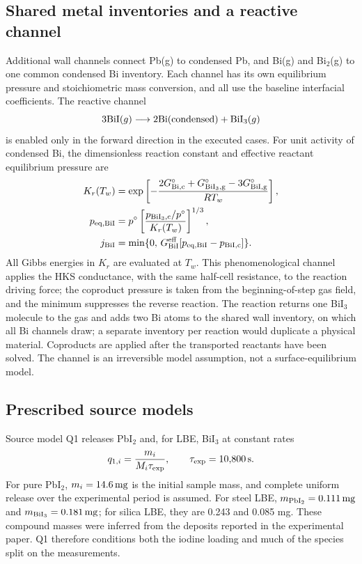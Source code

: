 \subsection{Shared metal inventories and a reactive channel}
Additional wall channels connect Pb(g) to condensed Pb, and Bi(g) and
Bi$_2$(g) to one common condensed Bi inventory. Each channel has its own
equilibrium pressure and stoichiometric mass conversion, and all use the
baseline interfacial coefficients. The reactive channel
\begin{equation}
 3\ce{BiI}(g)\longrightarrow 2\ce{Bi}(\mathrm{condensed})
                          +\ce{BiI3}(g)
 \label{eq:disproportionation}
\end{equation}
is enabled only in the forward direction in the executed cases. For
unit activity of condensed Bi, the dimensionless reaction constant and
effective reactant equilibrium pressure are
\begin{align}
 K_r(T_w)&=\exp\left[-\frac{2G_{\rm Bi,c}^\circ+
 G_{\rm BiI_3,g}^\circ-3G_{\rm BiI,g}^\circ}{RT_w}\right],\\
 p_{{\rm eq},\rm BiI}&=p^\circ
 \left[\frac{p_{\rm BiI_3,c}/p^\circ}{K_r(T_w)}\right]^{1/3},\\
 j_{\rm BiI}&=\min\{0,\,G_{\rm BiI}^{\rm eff}
                  [p_{{\rm eq},\rm BiI}-p_{\rm BiI,c}]\}.
 \label{eq:reactive-flux}
\end{align}
All Gibbs energies in $K_r$ are evaluated at $T_w$. This
phenomenological channel applies the HKS conductance, with the same
half-cell resistance, to the reaction driving force; the coproduct
pressure is taken from the beginning-of-step gas field, and the minimum
suppresses the reverse reaction. The reaction returns one BiI$_3$
molecule to the gas and adds two Bi atoms to the shared wall inventory,
on which all Bi channels draw; a separate inventory per reaction would
duplicate a physical material. Coproducts are applied after the
transported reactants have been solved. The channel is an irreversible
model assumption, not a surface-equilibrium model.

\subsection{Prescribed source models}
\label{sec:source}
Source model Q1 releases PbI$_2$ and, for LBE, BiI$_3$ at constant rates
\begin{equation}
 q_{1,i}=\frac{m_i}{M_i\tau_{\rm exp}},
 \qquad \tau_{\rm exp}=10{,}800\,\mathrm{s}.
 \label{eq:q1}
\end{equation}
For pure PbI$_2$, $m_i=14.6\,\mathrm{mg}$ is the initial sample mass, and
complete uniform release over the experimental period is assumed.
For steel LBE, $m_{\rm PbI_2}=0.111\,\mathrm{mg}$ and
$m_{\rm BiI_3}=0.181\,\mathrm{mg}$; for silica LBE, they are 0.243 and
0.085 mg. These compound masses were inferred from the deposits
reported in the experimental paper. Q1 therefore conditions both the
iodine loading and much of the species split on the measurements.

